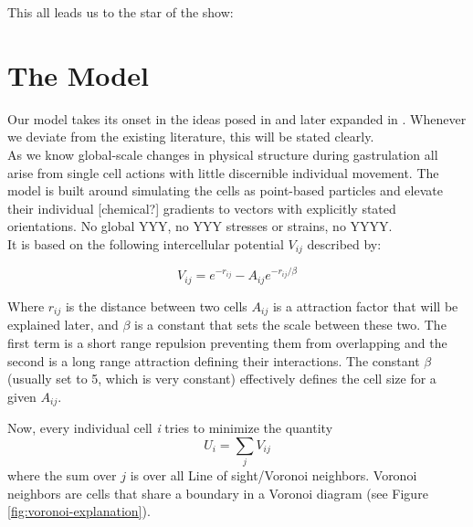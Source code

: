 







This all leads us to the star of the show:

\section{The Model}

Our model takes its onset in the ideas posed in  and later expanded in . Whenever we deviate from the existing literature, this will be stated clearly.\\

As we know global-scale changes in physical structure during gastrulation all arise from single cell actions with little discernible individual movement. The model is built around simulating the cells as point-based particles and elevate their individual [chemical?] gradients to vectors with explicitly stated orientations. No global YYY, no YYY stresses or strains, no YYYY. \\
It is based on the following intercellular potential $V_{ij}$ described by: 

\begin{equation}
    V_{ij}=e^{-r_{ij}}-A_{ij} e^{-r_{ij}/\beta}
    \label{eq:main-pot}
\end{equation}

Where $r_{ij}$ is the distance between two cells $A_{ij}$ is a attraction factor that will be explained later, and $\beta$ is a constant that sets the scale between these two. The first term is a short range repulsion preventing them from overlapping and the second is a long range attraction defining their interactions. The constant $\beta$ (usually set to 5, which is very constant) effectively defines the cell size for a given $A_{ij}$. 

Now, every individual cell \textit{i} tries to minimize the quantity 
\begin{equation}
    U_i = \sum_j V_{ij}
    \label{eq:totalPot}
\end{equation}
where the sum over $j$ is over all Line of sight/Voronoi neighbors. Voronoi neighbors are cells that share a boundary in a Voronoi diagram (see Figure \ref{fig:voronoi-explanation}). 

